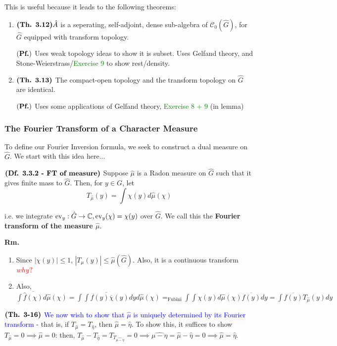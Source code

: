\documentclass{article}
\begin{document}
This is useful because it leads to the following theorems:

\begin{enumerate}
    \item $\textbf{(Th. 3.12)} \hat{A}$ is a seperating, self-adjoint, dense sub-algebra of $\mathcal{C}_{0}(\hat{G})$, for $\hat{G}$ equipped with transform topology.
    
    $(\textbf{Pf.})$ Uses weak topology ideas to show it is subset. Uses Gelfand theory, and Stone-Weierstrass/\textcolor{green}{Exercise 9} to show rest/density.
    \item $\textbf{(Th. 3.13)}$ The compact-open topology and the transform topology on $\hat{G}$ are identical.

    $(\textbf{Pf.})$ Uses some applications of Gelfand theory, \textcolor{green}{Exercise 8 + 9} (in lemma)
\end{enumerate}


\subsubsection{The Fourier Transform of a Character Measure}
To define our Fourier Inversion formula, we seek to construct a dual measure on $\hat{G}$. We start with this idea here...

$\textbf{(Df. 3.3.2 - FT of measure)}$ Suppose $\hat{\mu}$ is a Radon measure on $\hat{G}$ such that it gives finite mass to $\hat{G}$. Then, for $y \in G$, let $$T_{\hat{\mu}}(y) = \int \chi(y)d\hat{\mu}(\chi)$$

i.e. we integrate $\text{ev}_y:\hat{G} \rightarrow \mathbb{C}, \text{ev}_y(\chi) = \chi(y)$ over $\hat{G}$. We call this the \textbf{Fourier transform of the measure $\hat{\mu}$}.

\textbf{Rm. } \begin{enumerate}
    \item Since $|\chi(y)| \leq 1$, $|T_{\mu}(y)| \leq \hat{\mu}(\hat{G})$. Also, it is a continuous transform $\textcolor{red}{why?}$
    \item Also, $\int \overline{\hat{f}(\chi)} d\hat{\mu}(\chi) = \int \overline{\int f(y) \overline{\chi}(y)} dy d\hat{\mu}(\chi) =_{\text{Fubini}} \int \int \chi(y)d\hat{\mu}(\chi) \overline{f(y)} dy = \int \overline{f(y)} T_{\hat{\mu}}(y) dy$
\end{enumerate}

$\textbf{(Th. 3-16)}$ \textcolor{blue}{We now wish to show that $\hat{\mu}$ is uniquely determined by its Fourier transform} - that is, if $T_{\hat{\mu}} = T_{\hat{\eta}}$, then $\hat{\mu} = \hat{\eta}$. To show this, it suffices to show $T_{\hat{\mu}} = 0 \implies \hat{\mu} = 0$: then, $T_{\hat{\mu}} - T_{\hat{\eta}} = T_{T_{\hat{\mu - \eta}}} = 0 \implies \hat{\mu - \eta} = \hat{\mu} - \hat{\eta }=  0 \implies \hat{\mu} = \hat{\eta}$.
\end{document}
